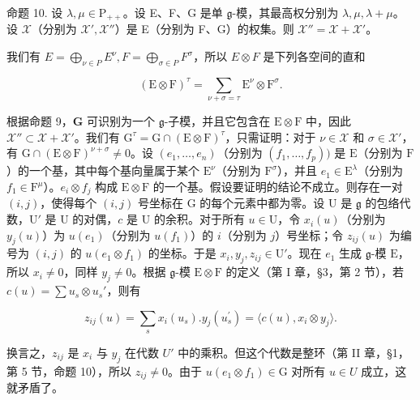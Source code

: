 命题 10. 设 \(\lambda, \mu \in \mathrm{P}_{++}\)。设 E、F、G 是单 \(\mathfrak{g}\)-模，其最高权分别为 \(\lambda, \mu, \lambda + \mu\)。设 \(\mathcal{X}\)（分别为 \(\mathcal{X}', \mathcal{X}''\)）是 E（分别为 F、G）的权集。则 \(\mathcal{X}'' = \mathcal{X} + \mathcal{X}'\)。

我们有 \(E = \bigoplus_{\nu \in P} E^{\nu}, F = \bigoplus_{\sigma \in P} F^{\sigma}\)，所以 \(E \otimes F\) 是下列各空间的直和

\[
(\mathrm{E} \otimes \mathrm{F}) ^ {\tau} = \sum_ {\nu + \sigma = \tau} \mathrm{E} ^ {\nu} \otimes \mathrm{F} ^ {\sigma}.
\]

根据命题 9，\(\mathbf{G}\) 可识别为一个 \(\mathfrak{g}\)-子模，并且它包含在 \(\mathrm{E} \otimes \mathrm{F}\) 中，因此 \(\mathcal{X}'' \subset \mathcal{X} + \mathcal{X}'\)。我们有 \(\mathrm{G}^{\tau} = \mathrm{G} \cap (\mathrm{E} \otimes \mathrm{F})^{\tau}\)，只需证明：对于 \(\nu \in \mathcal{X}\) 和 \(\sigma \in \mathcal{X}'\)，有 \(\mathrm{G} \cap (\mathrm{E} \otimes \mathrm{F})^{\nu + \sigma} \neq 0\)。设 \((e_1, \ldots, e_n)\)（分别为 \((f_1, \ldots, f_p))\) 是 \(\mathrm{E}\)（分别为 \(\mathrm{F}\)）的一个基，其中每个基向量属于某个 \(\mathrm{E}^\nu\)（分别为 \(\mathrm{F}^\sigma\)），并且 \(e_1 \in \mathrm{E}^\lambda\)（分别为 \(f_1 \in \mathrm{F}^\mu\)）。\(e_i \otimes f_j\) 构成 \(\mathrm{E} \otimes \mathrm{F}\) 的一个基。假设要证明的结论不成立。则存在一对 \((i,j)\)，使得每个 \((i,j)\) 号坐标在 \(\mathrm{G}\) 的每个元素中都为零。设 \(\mathrm{U}\) 是 \(\mathfrak{g}\) 的包络代数，\(\mathrm{U}'\) 是 \(\mathrm{U}\) 的对偶，\(c\) 是 \(\mathrm{U}\) 的余积。对于所有 \(u \in \mathrm{U}\)，令 \(x_i(u)\)（分别为 \(y_j(u)\)）为 \(u(e_1)\)（分别为 \(u(f_1)\)）的 \(i\)（分别为 \(j\)）号坐标；令 \(z_{ij}(u)\) 为编号为 \((i,j)\) 的 \(u(e_1 \otimes f_1)\) 的坐标。于是 \(x_i, y_j, z_{ij} \in \mathrm{U}'\)。现在 \(e_1\) 生成 \(\mathfrak{g}\)-模 \(\mathrm{E}\)，所以 \(x_i \neq 0\)，同样 \(y_j \neq 0\)。根据 \(\mathfrak{g}\)-模 \(\mathrm{E} \otimes \mathrm{F}\) 的定义（第 I 章，§3，第 2 节），若 \(c(u) = \sum u_s \otimes u_s'\)，则有

\[
z _ {i j} (u) = \sum_ {s} x _ {i} (u _ {s}). y _ {j} (u _ {s} ^ {\prime}) = \langle c (u), x _ {i} \otimes y _ {j} \rangle .
\]

换言之，\(z_{ij}\) 是 \(x_{i}\) 与 \(y_{j}\) 在代数 \(U'\) 中的乘积。但这个代数是整环（第 II 章，§1，第 5 节，命题 10），所以 \(z_{ij} \neq 0\)。由于 \(u(e_{1} \otimes f_{1}) \in \mathrm{G}\) 对所有 \(u \in U\) 成立，这就矛盾了。

